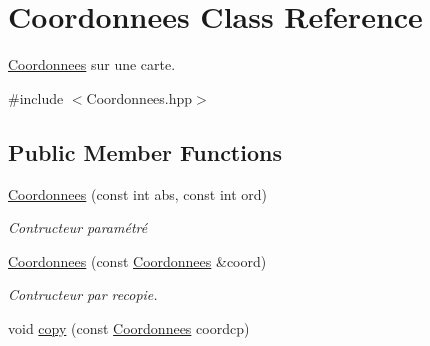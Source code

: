 \hypertarget{classCoordonnees}{\section{Coordonnees Class Reference}
\label{classCoordonnees}
}


\hyperlink{classCoordonnees}{Coordonnees} sur une carte.  




{\ttfamily \#include $<$Coordonnees.\-hpp$>$}

\subsection*{Public Member Functions}
\begin{DoxyCompactItemize}
\item 
\hyperlink{classCoordonnees_a6ec732bf5bf8b43d458340b9f2be9edb}{Coordonnees} (const int abs, const int ord)
\begin{DoxyCompactList}\small\item\em Contructeur paramétré \end{DoxyCompactList}\item 
\hyperlink{classCoordonnees_a30d6f3b61bfb6762709f9ae7c62dc4b7}{Coordonnees} (const \hyperlink{classCoordonnees}{Coordonnees} \&coord)
\begin{DoxyCompactList}\small\item\em Contructeur par recopie. \end{DoxyCompactList}\item 
\hypertarget{classCoordonnees_a0f5af89bc4c49a5cf265c8362567cbe1}{void \hyperlink{classCoordonnees_a0f5af89bc4c49a5cf265c8362567cbe1}{copy} (const \hyperlink{classCoordonnees}{Coordonnees} coordcp)}\label{classCoordonnees_a0f5af89bc4c49a5cf265c8362567cbe1}


\end{DoxyCompactItemize}
